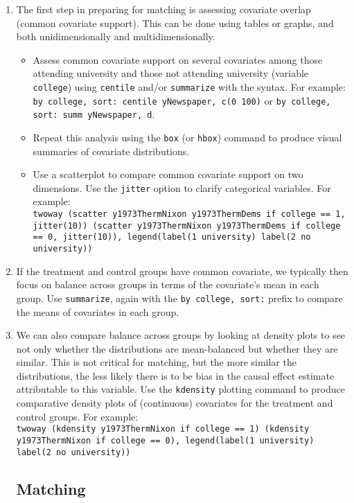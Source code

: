 \documentclass[a4paper,12pt]{article}
\begin{document}
\begin{enumerate}
\item The first step in preparing for matching is assessing covariate overlap (common covariate support). This can be done using tables or graphs, and both unidimensionally and multidimensionally. 
	\begin{itemize}
	\item Assess common covariate support on several covariates among those attending university and those not attending university (variable \texttt{college}) using \texttt{centile} and/or \texttt{summarize} with the  syntax. For example: \texttt{by college, sort: centile yNewspaper, c(0 100)} or \texttt{by college, sort: summ yNewspaper, d}.
	\item Repeat this analysis using the \texttt{box} (or \texttt{hbox}) command to produce visual summaries of covariate distributions.
	\item Use a scatterplot to compare common covariate support on two dimensions. Use the \texttt{jitter} option to clarify categorical variables. For example:\\ \texttt{twoway (scatter y1973ThermNixon y1973ThermDems if college == 1, jitter(10)) (scatter y1973ThermNixon y1973ThermDems if college == 0, jitter(10)), legend(label(1 university) label(2 no university))}
	\end{itemize}
\item If the treatment and control groups have common covariate, we typically then focus on balance across groups in terms of the covariate's mean in each group. Use \texttt{summarize}, again with the \texttt{by college, sort:} prefix to compare the means of covariates in each group.
\item We can also compare balance across groups by looking at density plots to see not only whether the distributions are mean-balanced but whether they are similar. This is not critical for matching, but the more similar the distributions, the less likely there is to be bias in the causal effect estimate attributable to this variable. Use the \texttt{kdensity} plotting command to produce comparative density plots of (continuous) covariates for the treatment and control groups. For example:\\ \texttt{twoway (kdensity y1973ThermNixon if college == 1) (kdensity y1973ThermNixon if college == 0), legend(label(1 university) label(2 no university))}

\subsection*{Matching}


\end{enumerate}
\end{document}
